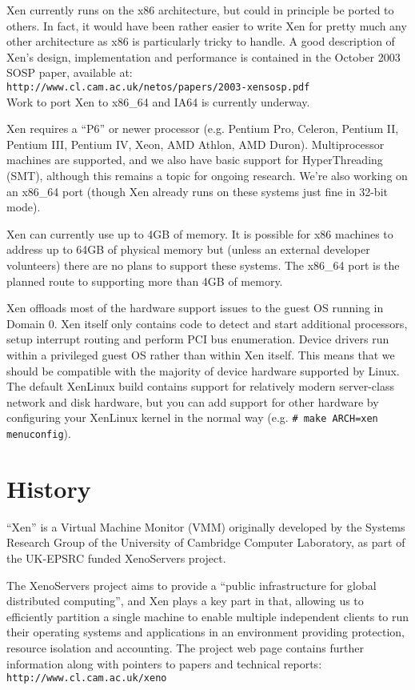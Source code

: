 \documentclass[11pt,twoside,final,openright]{xenstyle}
\begin{document}
Xen currently runs on the x86 architecture, but could in principle be
ported to others. In fact, it would have been rather easier to write
Xen for pretty much any other architecture as x86 is particularly
tricky to handle. A good description of Xen's design, implementation
and performance is contained in the October 2003 SOSP paper, available
at:\\
{\tt http://www.cl.cam.ac.uk/netos/papers/2003-xensosp.pdf}\\
Work to port Xen to x86\_64 and IA64 is currently underway.

Xen requires a ``P6'' or newer processor (e.g. Pentium Pro, Celeron,
Pentium II, Pentium III, Pentium IV, Xeon, AMD Athlon, AMD Duron).
Multiprocessor machines are supported, and we also have basic support
for HyperThreading (SMT), although this remains a topic for ongoing
research.  We're also working on an x86\_64 port (though Xen already
runs on these systems just fine in 32-bit mode).

Xen can currently use up to 4GB of memory.  It is possible for x86
machines to address up to 64GB of physical memory but (unless an
external developer volunteers) there are no plans to support these
systems.  The x86\_64 port is the planned route to supporting more
than 4GB of memory.

Xen offloads most of the hardware support issues to the guest OS
running in Domain 0.  Xen itself only contains code to detect and
start additional processors, setup interrupt routing and perform PCI
bus enumeration.  Device drivers run within a privileged guest OS
rather than within Xen itself.  This means that we should be
compatible with the majority of device hardware supported by Linux.
The default XenLinux build contains support for relatively modern
server-class network and disk hardware, but you can add support for
other hardware by configuring your XenLinux kernel in the normal way
(e.g. \verb_# make ARCH=xen menuconfig_).

\section{History}


``Xen'' is a Virtual Machine Monitor (VMM) originally developed by the
Systems Research Group of the University of Cambridge Computer
Laboratory, as part of the UK-EPSRC funded XenoServers project.

The XenoServers project aims to provide a ``public infrastructure for
global distributed computing'', and Xen plays a key part in that,
allowing us to efficiently partition a single machine to enable
multiple independent clients to run their operating systems and
applications in an environment providing protection, resource
isolation and accounting.  The project web page contains further
information along with pointers to papers and technical reports:
{\tt http://www.cl.cam.ac.uk/xeno}
\end{document}
